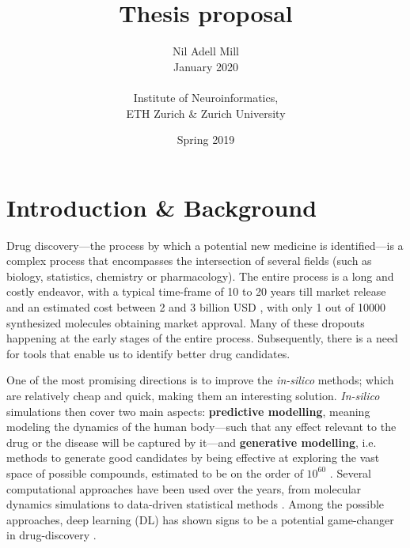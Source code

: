 \documentclass{article}
\begin{document}
\title{\Large Thesis proposal}
\author{Nil Adell Mill \\
        January 2020 \\ \\
        Institute of Neuroinformatics, \\
        ETH Zurich \& Zurich University}
\date{Spring 2019}

\maketitle

    \section*{Introduction \& Background}

Drug discovery---the process by which a potential new medicine is identified---is a
 complex process that encompasses the intersection of several fields (such as biology,
 statistics, chemistry or pharmacology). The entire process is a long and costly
 endeavor, with a typical time-frame of 10 to 20 years till market release and an
 estimated cost between 2 and 3 billion USD \cite{Schneider2019, Scannell2012}, with
 only 1 out of 10000 synthesized molecules obtaining market approval. Many of these
 dropouts happening at the early stages of the entire process.
 {\color{red}Subsequently}, there is a need for tools that enable us to identify better
 drug candidates.

One of the most promising directions is to improve the \emph{in-silico} methods; which
 are relatively cheap and quick, making them an interesting solution. \emph{In-silico}
 simulations then cover two main aspects: \textbf{predictive modelling}, meaning
 modeling the dynamics of the human body---such that any effect relevant to the drug or
 the disease will be captured by it---and \textbf{generative modelling}, i.e. methods to
 generate good candidates by being effective at exploring the vast space of possible
 compounds, estimated to be on the order of $10^{60}$ \cite{Reymond2012}. Several
 computational approaches have been used over the years, from molecular dynamics
 simulations to data-driven statistical methods \cite{Hung2014, Kuhn2016}. Among the
 possible approaches, deep learning (DL) has shown signs to be a potential game-changer
 in drug-discovery \cite{Dargan2019}. 
 
\end{document}

